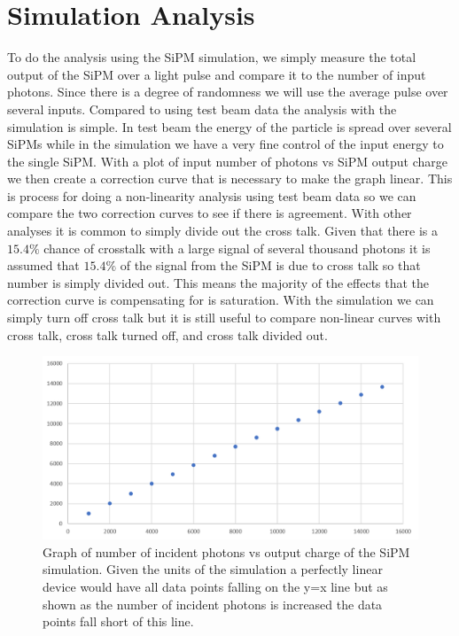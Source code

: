 \section{Simulation Analysis}

To do the analysis using the SiPM simulation, we simply measure the total output of the SiPM over a light pulse and compare it to the number of input photons. Since there is a degree of randomness we will use the average pulse over several inputs. Compared to using test beam data the analysis with the simulation is simple. In test beam the energy of the particle is spread over several SiPMs while in the simulation we have a very fine control of the input energy to the single SiPM. With a plot of input number of photons vs SiPM output charge we then create a correction curve that is necessary to make the graph linear. This is process for doing a non-linearity analysis using test beam data so we can compare the two correction curves to see if there is agreement. With other analyses it is common to simply divide out the cross talk. Given that there is a $15.4\%$ chance of crosstalk with a large signal of several thousand photons it is assumed that $15.4\%$ of the signal from the SiPM is due to cross talk so that number is simply divided out. This means the majority of the effects that the correction curve is compensating for is saturation. With the simulation we can simply turn off cross talk but it is still useful to compare non-linear curves with cross talk, cross talk turned off, and cross talk divided out.

\begin{figure}
\centering
\includegraphics[width=\linewidth]{Figures/SimNon.png}
\caption{Graph of number of incident photons vs output charge of the SiPM simulation. Given the units of the simulation a perfectly linear device would have all data points falling on the y=x line but as shown as the number of incident photons is increased the data points fall short of this line.}
\label{fig:SimNon}
\end{figure}

